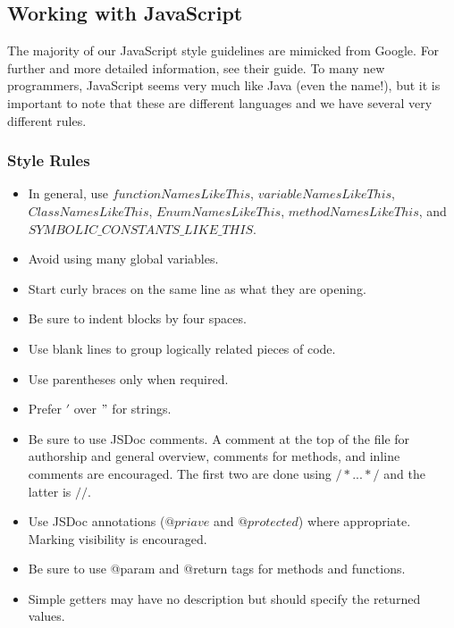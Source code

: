\documentclass[12pt]{article}
\begin{document}
\subsection{Working with JavaScript}
The majority of our JavaScript style guidelines are mimicked from Google\cite{JavaScriptStyle-Google}.  For further and more detailed information, see their guide.  To many new programmers, JavaScript seems very much like Java (even the name!), but it is important to note that these are different languages and we have several very different rules.

\subsubsection{Style Rules}
\begin{itemize}
\item In general, use $functionNamesLikeThis$, $variableNamesLikeThis$, $ClassNamesLikeThis$, $EnumNamesLikeThis$, $methodNamesLikeThis$, and $SYMBOLIC\_CONSTANTS\_LIKE\_THIS$.
\item Avoid using many global variables.
\item Start curly braces on the same line as what they are opening.
\item Be sure to indent blocks by four spaces.
\item Use blank lines to group logically related pieces of code.
\item Use parentheses only when required.
\item Prefer $'$ over $"$ for strings.
\item Be sure to use JSDoc comments.  A comment at the top of the file for authorship and general overview, comments for methods, and inline comments are encouraged.  The first two are done using $/*. . . */$ and the latter is $//$.
\item Use JSDoc annotations ($@priave$ and $@protected$) where appropriate.  Marking visibility is encouraged.
\item Be sure to use @param and @return tags for methods and functions.
\item Simple getters may have no description but should specify the returned values.
\end{itemize}
\end{document}
